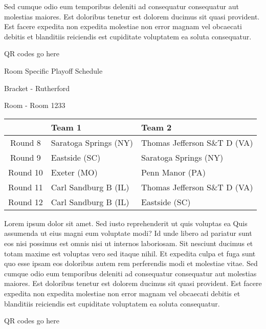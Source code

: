 \documentclass{article}%
\begin{document}
\newline%
Sed cumque odio eum temporibus deleniti ad consequatur consequatur aut molestias maiores. Est doloribus tenetur est dolorem ducimus sit quasi provident. Est facere expedita non expedita molestiae non error magnam vel obcaecati debitis et blanditiis reiciendis est cupiditate voluptatem ea soluta consequatur.%
\vspace*{140pt}%
\begin{center}%
\begin{Huge}%
QR codes go here%
\end{Huge}%
\end{center}%
\newpage%
\begin{center}%
\begin{Huge}%
Room Specific Playoff Schedule%
\end{Huge}%
\vspace*{8pt}%
\linebreak%
\begin{Large}%
Bracket {-} Rutherford%
\end{Large}%
\vspace*{8pt}%
\linebreak%
\vspace*{8pt}%
\begin{Large}%
Room {-} Room 1233%
\end{Large}%
\end{center}%
%
\begin{tabularx}{\textwidth}{|c|Y|Y|}%
\hline%
&Team 1&Team 2\\%
\hline%
Round 8&Saratoga Springs (NY)&Thomas Jefferson S\&T D (VA)\\%
Round 9&Eastside (SC)&Saratoga Springs (NY)\\%
Round 10&Exeter (MO)&Penn Manor (PA)\\%
Round 11&Carl Sandburg B (IL)&Thomas Jefferson S\&T D (VA)\\%
Round 12&Carl Sandburg B (IL)&Eastside (SC)\\%
\hline%
\end{tabularx}%
\vspace*{8pt}%
\newline%
Lorem ipsum dolor sit amet. Sed iusto reprehenderit ut quis voluptas ea Quis assumenda ut eius magni eum voluptate modi? Id unde libero ad pariatur sunt eos nisi possimus est omnis nisi ut internos laboriosam. Sit nesciunt ducimus et totam maxime est voluptas vero sed itaque nihil. Et expedita culpa et fuga sunt quo esse ipsam eos doloribus autem rem perferendis modi et molestiae vitae.\newline%
\newline%
Sed cumque odio eum temporibus deleniti ad consequatur consequatur aut molestias maiores. Est doloribus tenetur est dolorem ducimus sit quasi provident. Est facere expedita non expedita molestiae non error magnam vel obcaecati debitis et blanditiis reiciendis est cupiditate voluptatem ea soluta consequatur.%
\vspace*{140pt}%
\begin{center}%
\begin{Huge}%
QR codes go here%
\end{Huge}%
\end{center}%
\newpage%
\end{document}
